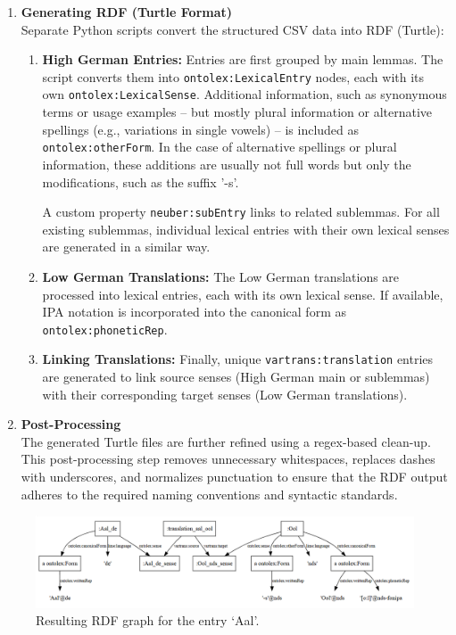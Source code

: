 \begin{enumerate}
    \item {\textbf{Generating RDF (Turtle Format)}}\\ 
    Separate Python scripts convert the structured CSV data into RDF (Turtle):
    \begin{enumerate}
        \item {\textbf{High German Entries:}} Entries are first grouped by main lemmas. The script converts them into \texttt{ontolex:LexicalEntry} nodes, each with its own \texttt{ontolex:LexicalSense}. Additional information, such as synonymous terms or usage examples -- but mostly plural information or alternative spellings (e.g., variations in single vowels) -- is included as \texttt{ontolex:otherForm}. In the case of alternative spellings or plural information, these additions are usually not full words but only the modifications, such as the suffix '-s'. 
        
        A custom property \texttt{neuber:subEntry} links to related sublemmas. For all existing sublemmas, individual lexical entries with their own lexical senses are generated in a similar way.
        \item {\textbf{Low German Translations:}} The Low German translations are processed into lexical entries, each with its own lexical sense. If available, IPA notation is incorporated into the canonical form as \texttt{ontolex:phoneticRep}.
        \item {\textbf{Linking Translations:}} Finally, unique \texttt{vartrans:translation} entries are generated to link source senses (High German main or sublemmas) with their corresponding target senses (Low German translations).
    \end{enumerate}

    \item {\textbf{Post-Processing}}\\  
    The generated Turtle files are further refined using a regex-based clean-up. This post-processing step removes unnecessary whitespaces, replaces dashes with underscores, and normalizes punctuation to ensure that the RDF output adheres to the required naming conventions and syntactic standards.
\end{enumerate}

\begin{figure}
    \centering
    \includegraphics[width=0.92\linewidth]{aal-rdf-graph.png}
    \caption{Resulting RDF graph for the entry ‘Aal’.}
    \label{fig:aal-graph}
\end{figure}

